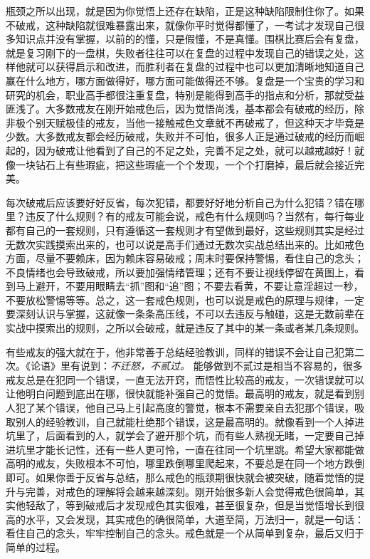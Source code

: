 瓶颈之所以出现，就是因为你觉悟上还存在缺陷，正是这种缺陷限制住你了。如果不破戒，这种缺陷就很难暴露出来，就像你平时觉得都懂了，一考试才发现自己很多知识点并没有掌握，以前的的懂，只是假懂，不是真懂。围棋比赛后会有复盘，就是复习刚下的一盘棋，失败者往往可以在复盘的过程中发现自己的错误之处，这样他就可以获得启示和改进，而胜利者在复盘的过程中也可以更加清晰地知道自己赢在什么地方，哪方面做得好，哪方面可能做得还不够。复盘是一个宝贵的学习和研究的机会，职业高手都很注重复盘，特别是能得到高手的指点和分析，那就受益匪浅了。大多数戒友在刚开始戒色后，因为觉悟尚浅，基本都会有破戒的经历，除非极个别天赋极佳的戒友，当他一接触戒色文章就不再破戒了，但这种天才毕竟是少数。大多数戒友都会经历破戒，失败并不可怕，很多人正是通过破戒的经历而崛起的，因为破戒让他看到了自己的不足之处，完善不足之处，就可以越戒越好！就像一块钻石上有些瑕疵，把这些瑕疵一个个发现，一个个打磨掉，最后就会接近完美。

每次破戒后应该要好好反省，每次犯错，都要好好地分析自己为什么犯错？错在哪里？违反了什么规则？有的戒友可能会说，戒色有什么规则吗？当然有，每行每业都有自己的一套规则，只有遵循这一套规则才有望做到最好，这些规则其实是经过无数次实践摸索出来的，也可以说是高手们通过无数次实战总结出来的。比如戒色方面，尽量不要赖床，因为赖床容易破戒；周末时要保持警惕，看住自己的念头；不良情绪也会导致破戒，所以要加强情绪管理；还有不要让视线停留在黄图上，看到马上避开，不要用眼睛去“抓”图和“追”图；不要去看黄，不要让意淫超过一秒，不要放松警惕等等。总之，这一套戒色规则，也可以说是戒色的原理与规律，一定要深刻认识与掌握，这就像一条条高压线，不可以去违反与触碰，这是无数前辈在实战中摸索出的规则，之所以会破戒，就是违反了其中的某一条或者某几条规则。

有些戒友的强大就在于，他非常善于总结经验教训，同样的错误不会让自己犯第二次。《论语》里有说到：\textit{不迁怒，不贰过。} 能够做到不贰过是相当不容易的，很多戒友总是在犯同一个错误，一直无法开窍，而悟性比较高的戒友，一次错误就可以让他明白问题到底出在哪，很快就能补强自己的觉悟。最高明的戒友，就是看到别人犯了某个错误，他自己马上引起高度的警觉，根本不需要亲自去犯那个错误，吸取别人的经验教训，自己就能杜绝那个错误，这是最高明的。就像看到一个人掉进坑里了，后面看到的人，就学会了避开那个坑，而有些人熟视无睹，一定要自己掉进坑里才能长记性，还有一些人更可怜，一直在往同一个坑里跳。希望大家都能做高明的戒友，失败根本不可怕，哪里跌倒哪里爬起来，不要总是在同一个地方跌倒即可。如果你善于反省与总结，那么戒色的瓶颈期很快就会被突破，随着觉悟的提升与完善，对戒色的理解将会越来越深刻。刚开始很多新人会觉得戒色很简单，其实他轻敌了，等到破戒后才发现戒色其实很难，甚至很复杂，但是当觉悟增长到很高的水平，又会发现，其实戒色的确很简单，大道至简，万法归一，就是一句话：看住自己的念头，牢牢控制自己的念头。戒色就是一个从简单到复杂，最后又归于简单的过程。

